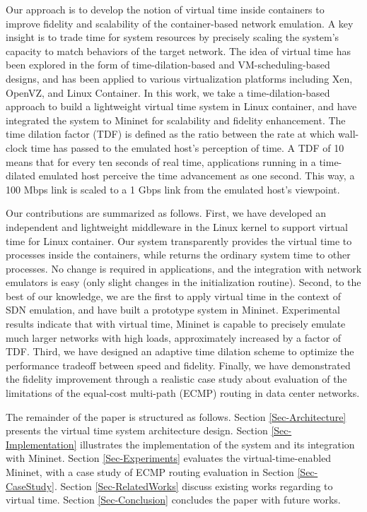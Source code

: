 Our approach is to develop the notion of virtual time inside containers to improve fidelity and scalability of the container-based network emulation. A key insight is to trade time for system resources by precisely scaling the system's capacity to match behaviors of the target network. The idea of virtual time has been explored in the form of time-dilation-based\cite{ToInfinityBeyond} and VM-scheduling-based\cite{VirtTimeOpenVZ, SliceTime}  designs, and has been applied to various virtualization platforms including Xen\cite{DieCast}, OpenVZ\cite{VirtTimeOpenVZ}, and Linux Container\cite{TimeKeeper}. In this work, we take a time-dilation-based approach to build a lightweight virtual time system in Linux container, and have integrated the system to Mininet for scalability and fidelity enhancement. The time dilation factor (TDF) is defined as the ratio between the rate at which wall-clock time has passed to the emulated host's perception of time\cite{ToInfinityBeyond}. A TDF of 10 means that for every ten seconds of real time, applications running in a time-dilated emulated host perceive the time advancement as one second. This way, a 100 Mbps link is scaled to a 1 Gbps link from the emulated host's viewpoint.

Our contributions are summarized as follows. First, we have developed an independent and lightweight middleware in the Linux kernel to support virtual time for Linux container. Our system transparently provides the virtual time to processes inside the containers, while returns the ordinary system time to other processes. %
No change is required in applications, and the integration with network emulators is easy (only slight changes in the initialization routine). Second, to the best of our knowledge, we are the first to apply virtual time in the context of SDN emulation, and have built a prototype system in Mininet. Experimental results indicate that with virtual time, Mininet is capable to precisely emulate much larger networks with high loads, approximately increased by a factor of TDF. Third, we have designed an adaptive time dilation scheme to optimize the performance tradeoff between speed and fidelity. Finally, we have demonstrated the fidelity improvement through a realistic case study about evaluation of the limitations of the equal-cost multi-path (ECMP) routing in data center networks.

The remainder of the paper is structured as follows. Section \ref{Sec-Architecture} presents the virtual time system architecture design. Section \ref{Sec-Implementation} illustrates the implementation of the system and its integration with Mininet. Section \ref{Sec-Experiments} evaluates the virtual-time-enabled Mininet, with a case study of ECMP routing evaluation in Section \ref{Sec-CaseStudy}. Section \ref{Sec-RelatedWorks} discuss existing works regarding to virtual time. Section \ref{Sec-Conclusion} concludes the paper with future works.

